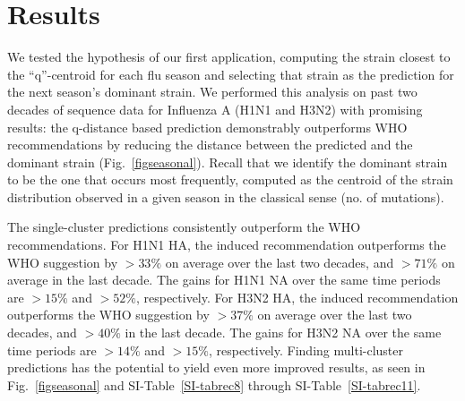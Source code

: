 \documentclass[onecolumn, compsoc,10pt]{IEEEtran}
\newif\ifFIGS
\begin{document}
 



\section*{Results} 

We tested the hypothesis of our first application, computing the strain closest to the ``q''-centroid for each flu season and selecting that strain as the prediction for the next season's dominant strain. We performed this analysis on past two decades of sequence data for Influenza A (H1N1 and H3N2) with promising results: the q-distance based prediction demonstrably outperforms WHO recommendations by reducing  the  distance between the predicted and  the dominant  strain (Fig.~\ref{figseasonal}). Recall that we identify the dominant strain to be the one that occurs most frequently, computed as the centroid of the strain distribution observed in a given season in the classical sense (no. of mutations).

\ifFIGS
\begin{table}[!ht]\centering
\captionN{Out-performance of \qnet recommendations over WHO 
for Influenza A vaccine composition}\label{tabperf}\centering

\sffamily\fontsize{9}{9}\selectfont


\end{table}
\else
{}\label{tabperf}
\fi

The \qnet single-cluster predictions consistently outperform the WHO recommendations. For H1N1 HA, the \qnet induced recommendation outperforms the WHO suggestion by $>33\%$ on average over the last two decades, and $>71\%$ on average in the last decade. The gains for H1N1 NA over the same time periods are $>15\%$ and $>52\%$, respectively. For H3N2 HA, the \qnet induced recommendation outperforms the WHO suggestion by $>37\%$ on average over the last two decades, and $>40\%$ in the last decade. The gains for H3N2 NA over the same time periods are $>14\%$ and $>15\%$, respectively. Finding multi-cluster predictions has the potential to yield even more improved results, as seen in Fig.~\ref{figseasonal} and SI-Table~\ref{SI-tabrec8} through SI-Table~\ref{SI-tabrec11}.
\end{document}
